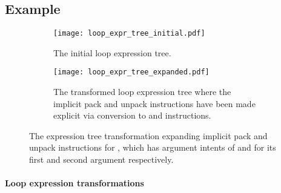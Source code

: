 \documentclass[thesis]{subfiles}
\begin{document}


\subsection{Example}

\begin{figure}
  \centering

  \begin{subfigure}[t]{.3\textwidth}
    \texttt{[image: loop\_expr\_tree\_initial.pdf]}
    \caption{The initial loop expression tree.}
    \label{fig:loop_expr_tree_transform_initial}
  \end{subfigure}
  \hfill
  \begin{subfigure}[t]{.68\textwidth}
    \texttt{[image: loop\_expr\_tree\_expanded.pdf]}
    \caption{The transformed loop expression tree where the implicit pack and unpack instructions have been made explicit via conversion to  and  instructions.}
    \label{fig:loop_expr_tree_transform_expanded}
  \end{subfigure}

  \caption{
    The expression tree transformation expanding implicit pack and unpack instructions for , which has argument intents of  and  for its first and second argument respectively.
  }
  \label{fig:loop_expr_tree_transform}
\end{figure}

\paragraph{Loop expression transformations}
\end{document}
